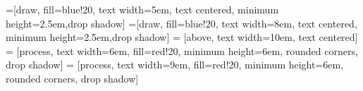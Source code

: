 \documentclass{article}
\begin{document}


=[draw, fill=blue!20, text width=5em, 
    text centered, minimum height=2.5em,drop shadow]
=[draw, fill=blue!20, text width=8em, 
    text centered, minimum height=2.5em,drop shadow]
 = [above, text width=10em, text centered]
 = [process, text width=6em, fill=red!20, 
    minimum height=6em, rounded corners, drop shadow]
 = [process, text width=9em, fill=red!20, 
    minimum height=6em, rounded corners, drop shadow]

\def\blockdist{2.3}
\def\edgedist{2.5}
\end{document}
